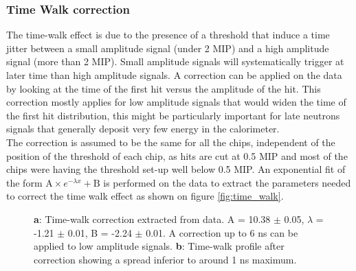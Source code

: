 \documentclass[twoside,a4paper,11pt]{article}
\begin{document}
\subsubsection{Time Walk correction}
\label{subsec:timewalk}

The time-walk effect is due to the presence of a threshold that induce a time jitter between a small amplitude signal (under 2 MIP) and a high amplitude signal (more than 2 MIP). Small amplitude signals will systematically trigger at later time than high amplitude signals. A correction can be applied on the data by looking at the time of the first hit versus the amplitude of the hit. This correction mostly applies for low amplitude signals that would widen the time of the first hit distribution, this might be particularly important for late neutrons signals that generally deposit very few energy in the calorimeter.\\
The correction is assumed to be the same for all the chips, independent of the position of the threshold of each chip, as hits are cut at 0.5 MIP and most of the chips were having the threshold set-up well below 0.5 MIP. An exponential fit of the form $\text{A} \times e^{-\lambda{}x} + \text{B}$ is performed on the data to extract the parameters needed to correct the time walk effect as shown on figure \ref{fig:time_walk}.
\begin{figure}[htbp]
	\hfill
	\caption[]{\textbf{a}: Time-walk correction extracted from data. A = 10.38 $\pm$ 0.05, $\lambda$ = -1.21 $\pm$ 0.01, B = -2.24 $\pm$ 0.01. A correction up to 6 ns can be applied to low amplitude signals. \textbf{b}: Time-walk profile after correction showing a spread inferior to around 1 ns maximum.}
\end{figure}
\end{document}
